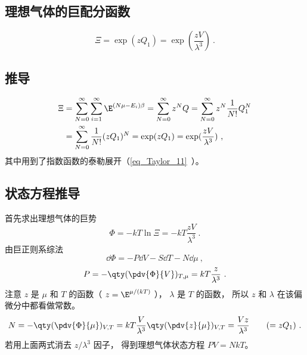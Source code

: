 
\begin{issues}
\issueDraft
\end{issues}

\subsection{理想气体的巨配分函数}
\begin{equation}\label{eq_IdMCE_1}
\Xi  = \exp(z Q_1) = \exp(\frac{zV}{\lambda^3})~.
\end{equation}
\subsection{推导}
\begin{equation}\label{eq_IdMCE_2}
\begin{aligned}
\Xi & = \sum_{N = 0}^\infty  \sum_{i = 1}^\infty  \E^{(N\mu - E_i)\beta}  = \sum_{N = 0}^\infty  z^N Q
 = \sum_{N = 0}^\infty  z^N \frac{1}{N!}Q_1^N \\
& = \sum_{N=0}^\infty  \frac{1}{N!} (z Q_1)^N
= \exp(z Q_1) = \exp(\frac{zV}{\lambda^3})~,
\end{aligned}
\end{equation}
其中用到了指数函数的泰勒展开（\autoref{eq_Taylor_11}~）。

\subsection{状态方程推导}
首先求出理想气体的巨势
\begin{equation}\label{eq_IdMCE_4}
\Phi  =  - kT\ln \Xi  =  - kT\frac{zV}{\lambda ^3}~.
\end{equation}
由巨正则系综法
\begin{equation}\label{eq_IdMCE_5}
\dd{\Phi} =  - P\dd{V} - S\dd{T} - N\dd{\mu}~,
\end{equation}
\begin{equation}\label{eq_IdMCE_6}
P = - \qty(\pdv{\Phi}{V})_{T, \mu} = kT\frac{z}{\lambda ^3}~.
\end{equation}
注意 $z$ 是 $\mu $ 和 $T$ 的函数（ $z = \E^{\mu/(kT)}$ ）， $\lambda $ 是 $T$ 的函数， 所以 $z$ 和 $\lambda $ 在该偏微分中都看做常数。
\begin{equation}\label{eq_IdMCE_7}
N = - \qty(\pdv{\Phi}{\mu})_{V,T} = kT\frac{V}{\lambda^3} \qty(\pdv{z}{\mu})_{V,T} = \frac{Vz}{\lambda ^3} 
\qquad ( = z{Q_1})~.
\end{equation}
若用上面两式消去 $z/\lambda^3$ 因子， 得到理想气体状态方程 $PV = NkT$。
  
